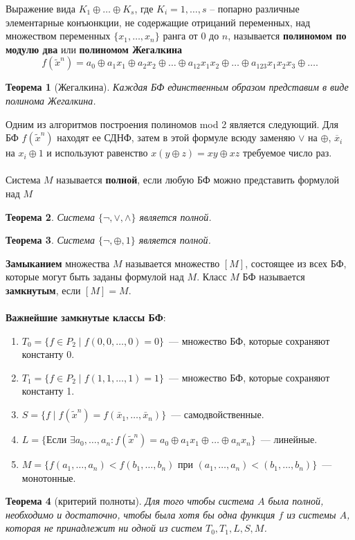 \documentclass[a4paper, 12pt]{report}
\numberwithin{equation}{section}
\newtheorem*{theorem}{Теорема}
\begin{document}
	Выражение вида $K_1\oplus \ldots \oplus K_s$, где $K_i = 1,\ldots, s$ -- попарно различные элементарные конъюнкции, не содержащие отрицаний переменных, над множеством переменных $\{x_1,\ldots, x_n\}$ ранга от $0$ до $n$, называется \textbf{полиномом по модулю два} или \textbf{полиномом Жегалкина}
	\begin{equation}
		f(\widetilde{x}^n)=a_0\oplus a_1x_1 \oplus a_2 x_2\oplus \ldots\oplus a_{12}x_1x_2\oplus \ldots \oplus a_{123}x_1 x_2 x_3 \oplus \ldots.
	\end{equation}
	\begin{theorem}
		[Жегалкина] Каждая БФ единственным образом представим в виде полинома Жегалкина.
	\end{theorem}
	\noindent
	Одним из алгоритмов построения полиномов mod 2 является
	следующий. Для БФ $f(\widetilde{x}^n)$ находят ее СДНФ, затем в этой формуле всюду заменяю $\vee$ на $\oplus$, $\overline x_i$ на $x_i\oplus 1$ и используют равенство $x(y\oplus z)=xy\oplus xz$ требуемое число раз.
	\\\\
	Система $M$ называется \textbf{полной}, если любую БФ можно представить формулой над $M$
	\begin{theorem}
		Система $\{\neg, \vee, \wedge\}$ является полной.
	\end{theorem}
	\begin{theorem}
		Система $\{\neg, \oplus, 1\}$ является полной.
	\end{theorem}
	\noindent
	\textbf{Замыканием} множества $M$
	называется множество $[M]$, состоящее из всех БФ,
	которые могут быть заданы формулой над $M$. Класс $M$ БФ называется
	\textbf{замкнутым}, если $[M]=M$.
	\\\\
	\textbf{Важнейшие замкнутые классы БФ}:
	\begin{enumerate}
		\item $T_0 = \{f \in P_2 \mid f(0, 0, \ldots, 0) = 0\}$~--- множество БФ, которые сохраняют константу 0.
		\item $T_1 = \{f \in P_2 \mid f(1, 1, \ldots, 1) = 1\}$~--- множество БФ, которые сохраняют константу 1.
		\item $S = \{f \mid f(\widetilde{x}^n) = f(\bar{x}_1, \ldots, \bar{x}_n)\}$~--- самодвойственные.
		\item $L = \{\text{Если } \exists a_0, \ldots, a_n: f(\widetilde{x}^n) = a_0 \oplus a_1 x_1 \oplus \ldots \oplus a_n x_n\}$~--- линейные.
		\item $M = \{f(a_1, \ldots, a_n) < f(b_1, \ldots, b_n) \text{ при } (a_1, \ldots, a_n) < (b_1, \ldots, b_n)\}$~--- монотонные.
	\end{enumerate}
	\begin{theorem}
		[критерий полноты]
		Для того чтобы система $A$ была \textit{полной}, необходимо и достаточно, чтобы была хотя бы одна функция $f$ из системы $A$, которая не принадлежит ни одной из систем $T_0, T_1, L, S, M$.
	\end{theorem}
\end{document}
